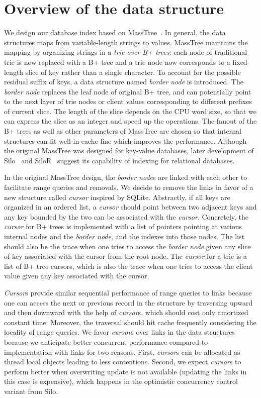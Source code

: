 \documentclass[sigplan,review,anonymous]{acmart}\settopmatter{printfolios=true,printccs=false,printacmref=false}
\begin{document}
\section{Overview of the data structure}

We design our database index based on MassTree~\cite{masstree}. In general, the
data structures maps from variable-length strings to values. MassTree maintains
the mapping by organizing strings in a \textit{trie over B+ trees}: each node of
traditional trie is now replaced with a B+ tree and a trie node now corresponds
to a fixed-length slice of key rather than a single character. To account for
the possible residual suffix of keys, a data structure named \textit{border
  node} is introduced. The \textit{border node} replaces the leaf node of
original B+ tree, and can potentially point to the next layer of trie nodes or
client values corresponding to different prefixes of current slice. The length
of the slice depends on the CPU word size, so that we can express the slice as
an integer and speed up the operations. The fanout of the B+ trees as well as
other parameters of MassTree are chosen so that internal structures can fit well
in cache line which improves the performance. Although the original MassTree was
designed for key-value databases, later development of Silo~\cite{Silo} and
SiloR~\cite{SiloR} suggest its capability of indexing for relational databases.

In the original MassTree design, the \textit{border node}s are linked with each
other to facilitate range queries and removals. We decide to remove the links in
favor of a new structure called \textit{cursor} inspired by SQLite. Abstractly,
if all keys are organized in an ordered list, a \textit{cursor} should point
between two adjacent keys and any key bounded by the two can be associated with
the \textit{cursor}. Concretely, the \textit{cursor} for B+ trees is implemented
with a list of pointers pointing at various internal nodes and the
\textit{border node}, and the indexes into those nodes. The list should also be
the trace when one tries to access the \textit{border node} given any slice of
key associated with the cursor from the root node. The \textit{cursor} for a
trie is a list of B+ tree cursors, which is also the trace when one tries to
access the client value given any key associated with the cursor.

\textit{Cursor}s provide similar sequential performance of range queries to
links because one can access the next or previous record in the structure by
traversing upward and then downward with the help of \textit{cursor}s, which
should cost only amortized constant time. Moreover, the traversal should hit
cache frequently considering the locality of range queries. We favor
\textit{cursor}s over links in the data structures because we anticipate better
concurrent performance compared to implementation with links for two reasons.
First, \textit{cursor}s can be allocated as thread local objects leading to less
contentions. Second, we expect \textit{cursor}s to perform better when
overwriting update is not available (updating the links in this case is
expensive), which happens in the optimistic concurrency control variant from
Silo.
\end{document}
